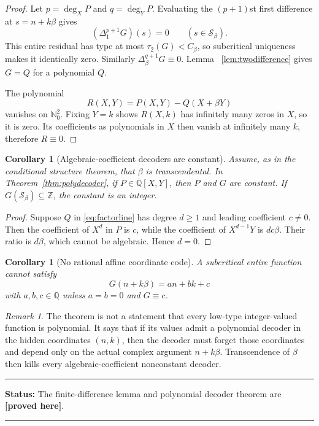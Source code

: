 \documentclass[11pt,oneside]{article}
\newtheorem{corollary}[theorem]{Corollary}
\theoremstyle{definition}
\theoremstyle{remark}
\newtheorem{remark}[theorem]{Remark}
\newcommand{\Nzero}{\mathbb N_0}
\newcommand{\Z}{\mathbb Z}
\newcommand{\Q}{\mathbb Q}
\newcommand{\Abar}{\overline{\mathbb Q}}
\newcommand{\Sbeta}{\mathcal S_\beta}
\newcommand{\Cbeta}{C_\beta}
\newcommand{\Del}[1]{\Delta_{#1}}
\newcommand{\statusproved}{\textcolor{provedgreen}{\textbf{[proved here]}}}
\newenvironment{statusbox}[1]
{\begin{center}\begin{minipage}{0.94\textwidth}\raggedright\hrule\vspace{0.45em}\textbf{Status:} #1\par\vspace{0.35em}}
{\vspace{0.35em}\hrule\end{minipage}\end{center}}
\begin{document}
\begin{proof}
Let $p=\deg_XP$ and $q=\deg_YP$.  Evaluating the $(p+1)$st first difference at
$s=n+k\beta$ gives
\[
 (\Del{1}^{p+1}G)(s)=0
 \qquad(s\in\Sbeta).
\]
This entire residual has type at most $\tau_2(G)<\Cbeta$, so subcritical uniqueness makes
it identically zero.  Similarly $\Del{\beta}^{q+1}G\equiv0$.  Lemma
~\ref{lem:twodifference} gives $G=Q$ for a polynomial $Q$.

The polynomial
\[
 R(X,Y)=P(X,Y)-Q(X+\beta Y)
\]
vanishes on $\Nzero^2$.  Fixing $Y=k$ shows $R(X,k)$ has infinitely many zeros in $X$,
so it is zero.  Its coefficients as polynomials in $X$ then vanish at infinitely many $k$,
therefore $R\equiv0$.
\end{proof}

\begin{corollary}[Algebraic-coefficient decoders are constant]
\label{cor:algdecoder}
Assume, as in the conditional structure theorem, that $\beta$ is transcendental.  In
Theorem~\ref{thm:polydecoder}, if $P\in\Abar[X,Y]$, then $P$ and $G$ are constant.  If
$G(\Sbeta)\subseteq\Z$, the constant is an integer.
\end{corollary}

\begin{proof}
Suppose $Q$ in \eqref{eq:factorline} has degree $d\ge1$ and leading coefficient $c\ne0$.
Then the coefficient of $X^d$ in $P$ is $c$, while the coefficient of $X^{d-1}Y$ is
$dc\beta$.  Their ratio is $d\beta$, which cannot be algebraic.  Hence $d=0$.
\end{proof}

\begin{corollary}[No rational affine coordinate code]
A subcritical entire function cannot satisfy
\[
 G(n+k\beta)=an+bk+c
\]
with $a,b,c\in\Q$ unless $a=b=0$ and $G\equiv c$.
\end{corollary}

\begin{remark}
The theorem is not a statement that every low-type integer-valued function is polynomial.
It says that if its values admit a polynomial decoder in the hidden coordinates $(n,k)$,
then the decoder must forget those coordinates and depend only on the actual complex
argument $n+k\beta$.  Transcendence of $\beta$ then kills every algebraic-coefficient
nonconstant decoder.
\end{remark}

\begin{statusbox}{The finite-difference lemma and polynomial decoder theorem are
\statusproved.}
\end{statusbox}
\end{document}
